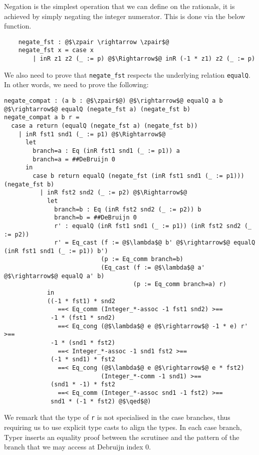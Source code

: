 \documentclass[12pt,twoside,maitrise]{dms}
\theoremstyle{definition}
\numberwithin{equation}{section}
\numberwithin{table}{chapter}
\numberwithin{figure}{chapter}
\newcommand\id[1] {\texttt{#1}}
\renewcommand\qed{\blacksquare}
\begin{document}
Negation is the simplest operation that we can define on the rationals, it is
achieved by simply negating the integer numerator. This is done via the below
function.

\begin{verbatim}
    negate_fst : @$\zpair \rightarrow \zpair$@
    negate_fst x = case x
        | inR z1 z2 (_ := p) @$\Rightarrow$@ inR (-1 * z1) z2 (_ := p)
\end{verbatim}

We also need to prove that \id{negate\_fst} respects the underlying relation
\id{equalQ}. In other words, we need to prove the following:

\begin{verbatim}
negate_compat : (a b : @$\zpair$@) @$\rightarrow$@ equalQ a b @$\rightarrow$@ equalQ (negate_fst a) (negate_fst b)
negate_compat a b r =
  case a return (equalQ (negate_fst a) (negate_fst b))
    | inR fst1 snd1 (_ := p1) @$\Rightarrow$@
      let
        branch=a : Eq (inR fst1 snd1 (_ := p1)) a
        branch=a = ##DeBruijn 0
      in
        case b return equalQ (negate_fst (inR fst1 snd1 (_ := p1))) (negate_fst b)
          | inR fst2 snd2 (_ := p2) @$\Rightarrow$@
            let
              branch=b : Eq (inR fst2 snd2 (_ := p2)) b
              branch=b = ##DeBruijn 0
              r' : equalQ (inR fst1 snd1 (_ := p1)) (inR fst2 snd2 (_ := p2))
              r' = Eq_cast (f := @$\lambda$@ b' @$\rightarrow$@ equalQ (inR fst1 snd1 (_ := p1)) b')
                           (p := Eq_comm branch=b)
                           (Eq_cast (f := @$\lambda$@ a' @$\rightarrow$@ equalQ a' b)
                                    (p := Eq_comm branch=a) r)
            in
            ((-1 * fst1) * snd2
               ==< Eq_comm (Integer_*-assoc -1 fst1 snd2) >==
             -1 * (fst1 * snd2)
               ==< Eq_cong (@$\lambda$@ e @$\rightarrow$@ -1 * e) r' >==
             -1 * (snd1 * fst2)
               ==< Integer_*-assoc -1 snd1 fst2 >==
             (-1 * snd1) * fst2
               ==< Eq_cong (@$\lambda$@ e @$\rightarrow$@ e * fst2)
                           (Integer_*-comm -1 snd1) >==
             (snd1 * -1) * fst2
               ==< Eq_comm (Integer_*-assoc snd1 -1 fst2) >==
             snd1 * (-1 * fst2) @$\qed$@)
\end{verbatim}

We remark that the type of \id{r} is not specialised in the case branches, thus
requiring us to use explicit type casts to align the types. In each case branch,
Typer inserts an equality proof between the scrutinee and the pattern of the
branch that we may access at Debruijn index 0.
\end{document}
